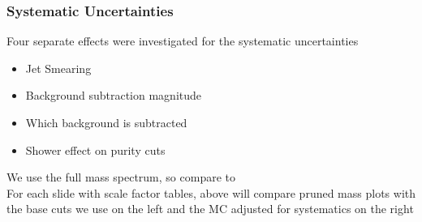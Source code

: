 \documentclass{beamer}
\begin{document}
\begin{frame}
  \frametitle{Systematic Uncertainties}
 Four separate effects were investigated for the systematic uncertainties
  \begin{itemize}
  \item Jet Smearing
  \item Background subtraction magnitude
  \item Which background is subtracted
  \item Shower effect on purity cuts
  \end{itemize}
  We  use the full mass spectrum, so compare to
   \\
  For each slide with scale factor tables, above will compare pruned mass plots with the base
  cuts we use on the left and the MC adjusted for systematics on the right
\end{frame}
\end{document}
